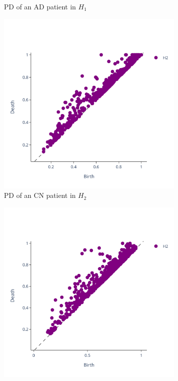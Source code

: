 \documentclass{article}
\begin{document}
\begin{figure}
\begin{subfigure}{0.32\textwidth}
    \caption{PD of an AD patient in $H_1$}
  \end{subfigure}
  \begin{subfigure}{0.32\textwidth}
    \includegraphics[width=\textwidth]{figures/PDs/persistence_diagram_CN_H_2.png}
    \caption{PD of an CN patient in $H_2$}
  \end{subfigure}
  \begin{subfigure}{0.32\textwidth}
    \includegraphics[width=\textwidth]{figures/PDs/persistence_diagram_MCI_H_2.png}

\end{subfigure}
\end{figure}
\end{document}
